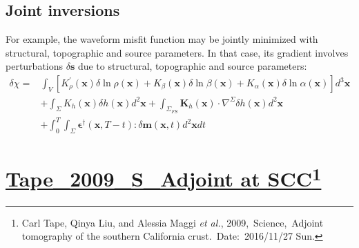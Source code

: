 \documentclass{article}
\newcommand{\Ppath}{/home/tche/Learning/Learning/Paper/}
\newcommand{\prf}{This is relative path from \Papth to the paper file}
\newcommand{\pmk}{This is the brief info.}
\newcommand{\pti}{This is the paper tile}
\newcommand{\pay}{These are authors and year}
\newcommand{\pjo}{This is the journal}
\newcommand{\pda}{This is the date}
\newcommand{\refp}[1]{\href{run:\Ppath\prf}{#1}}
\newcommand{\pinfo}{\refp{\pmk}\footnote{\pay,~\pjo,~\pti.~Date:~\pda}}
\newcommand{\mbf}[1]{\mathbf{#1}}
\newcommand{\etal}{\textit{et al.}}
\begin{document}
\subsection{Joint inversions}
For example, the waveform misfit function may be jointly minimized with structural, topographic and source parameters. In that case, its gradient involves perturbations $\delta\mbf s$ due to structural, topographic and source parameters:
\begin{align*}
  \delta\chi= & \int_V[K_\rho^\prime(\mbf x)\delta\ln\rho(\mbf x)+K_\beta(\mbf x)\delta\ln\beta(\mbf x)+K_\alpha(\mbf x)\delta\ln\alpha(\mbf x)]d^3\mbf x \\
    & +\int_\Sigma K_h(\mbf x)\delta h(\mbf x)d^2\mbf x+\int_{\Sigma_{FS}}\mbf K_h(\mbf x)\cdot\nabla^\Sigma\delta h(\mbf x)d^2\mbf x \\
	& +\int_0^T\int_\Sigma\mbf\epsilon^\dagger(\mbf x,T-t):\delta\mbf m(\mbf x,t)d^2\mbf xdt
\end{align*}\par
\vspace{5mm}

\renewcommand{\pmk}{Tape\_2009\_S\_Adjoint at SCC}
\renewcommand{\prf}{FWI/\pmk.pdf}
\renewcommand{\pti}{Adjoint tomography of the southern California crust}
\renewcommand{\pay}{Carl Tape, Qinya Liu, and Alessia Maggi \etal, 2009}
\renewcommand{\pjo}{Science}
\renewcommand{\pda}{2016/11/27 Sun.}
\section{\pinfo}
\end{document}
